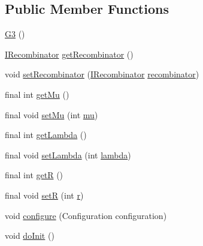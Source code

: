 \subsection*{Public Member Functions}
\begin{DoxyCompactItemize}
\item 
\hyperlink{classnet_1_1sf_1_1jclec_1_1algorithm_1_1gengap_1_1_g3_a51512b95f02cf096d4e3ad1707cea740}{G3} ()
\item 
\hyperlink{interfacenet_1_1sf_1_1jclec_1_1_i_recombinator}{I\-Recombinator} \hyperlink{classnet_1_1sf_1_1jclec_1_1algorithm_1_1gengap_1_1_g3_a01270bb20828c11e75b92f19bde0c410}{get\-Recombinator} ()
\item 
void \hyperlink{classnet_1_1sf_1_1jclec_1_1algorithm_1_1gengap_1_1_g3_a32a85d47f3a78b60b571abe6abadb804}{set\-Recombinator} (\hyperlink{interfacenet_1_1sf_1_1jclec_1_1_i_recombinator}{I\-Recombinator} \hyperlink{classnet_1_1sf_1_1jclec_1_1algorithm_1_1gengap_1_1_g3_a079407128e3e5eb01b3777e5e7a9c488}{recombinator})
\item 
final int \hyperlink{classnet_1_1sf_1_1jclec_1_1algorithm_1_1gengap_1_1_g3_a49904604450e461b226314bc3219054a}{get\-Mu} ()
\item 
final void \hyperlink{classnet_1_1sf_1_1jclec_1_1algorithm_1_1gengap_1_1_g3_a2ad0b2486a6700e36d0be0c2ab07c1dc}{set\-Mu} (int \hyperlink{classnet_1_1sf_1_1jclec_1_1algorithm_1_1gengap_1_1_g3_aa4ddf4a074688412a3fe669aac3283a1}{mu})
\item 
final int \hyperlink{classnet_1_1sf_1_1jclec_1_1algorithm_1_1gengap_1_1_g3_a5ea993b026f651ac96864ed504096f89}{get\-Lambda} ()
\item 
final void \hyperlink{classnet_1_1sf_1_1jclec_1_1algorithm_1_1gengap_1_1_g3_af019015e3f69f52f6944ed498b7a5df3}{set\-Lambda} (int \hyperlink{classnet_1_1sf_1_1jclec_1_1algorithm_1_1gengap_1_1_g3_ad0bae64a81015d9bfd89a37a1273ae05}{lambda})
\item 
final int \hyperlink{classnet_1_1sf_1_1jclec_1_1algorithm_1_1gengap_1_1_g3_af092f90203be10fd462c385e78d44bbb}{get\-R} ()
\item 
final void \hyperlink{classnet_1_1sf_1_1jclec_1_1algorithm_1_1gengap_1_1_g3_a2b92c40476ac5188c83e42528caf00d6}{set\-R} (int \hyperlink{classnet_1_1sf_1_1jclec_1_1algorithm_1_1gengap_1_1_g3_ab4b67f3578c57a6c888a620f90d02c0e}{r})
\item 
void \hyperlink{classnet_1_1sf_1_1jclec_1_1algorithm_1_1gengap_1_1_g3_a4453ecc8819a46cc733d5f3792b19e78}{configure} (Configuration configuration)
\item 
void \hyperlink{classnet_1_1sf_1_1jclec_1_1algorithm_1_1gengap_1_1_g3_aa63856d552765e073a18a74708555e18}{do\-Init} ()
\end{DoxyCompactItemize}
